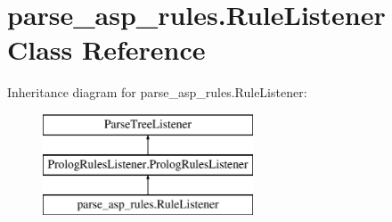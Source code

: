 \hypertarget{classparse__asp__rules_1_1_rule_listener}{}\section{parse\+\_\+asp\+\_\+rules.\+Rule\+Listener Class Reference}
\label{classparse__asp__rules_1_1_rule_listener}
Inheritance diagram for parse\+\_\+asp\+\_\+rules.\+Rule\+Listener\+:\begin{figure}[H]
\begin{center}
\leavevmode
\includegraphics[height=3.000000cm]{classparse__asp__rules_1_1_rule_listener}
\end{center}
\end{figure}
